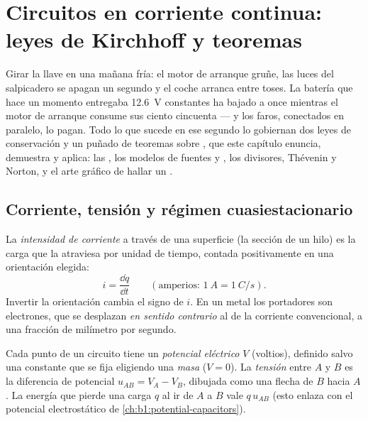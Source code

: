 \chapter{Circuitos en corriente continua: leyes de Kirchhoff y teoremas}\label{ch:b1:dc-circuits}

Girar la llave en una mañana fría: el motor de arranque gruñe, las luces
del salpicadero se apagan un segundo y el coche arranca entre toses. La
batería que hace un momento entregaba \qty{12.6}{V} constantes ha bajado a
once mientras el motor de arranque consume sus ciento cincuenta 
--- y los faros, conectados en paralelo, lo pagan. Todo lo que sucede en
ese segundo lo gobiernan dos leyes de conservación y un puñado de teoremas
sobre , que este capítulo enuncia, demuestra y aplica:
las , los modelos de fuentes y , los
divisores, Thévenin y Norton, y el arte gráfico de hallar un .

\section{Corriente, tensión y régimen cuasiestacionario}

\begin{definition}\label{def:b1:dc-circuits:current}
La \emph{intensidad de corriente} a través de una superficie (la sección
de un hilo) es la carga que la atraviesa por unidad de tiempo, contada
positivamente en una orientación elegida:
\[
i = \frac{\dd q}{\dd t} \qquad (\text{amperios: } \qty{1}{A} = \qty{1}{C/s}).
\]
Invertir la orientación cambia el signo de $i$. En un metal los portadores
son electrones, que se desplazan \emph{en sentido contrario} al de la
corriente convencional, a una fracción de milímetro por segundo.
\end{definition}

\begin{definition}\label{def:b1:dc-circuits:voltage}
Cada punto de un circuito tiene un \emph{potencial eléctrico} $V$
(voltios), definido salvo una constante que se fija eligiendo una
\emph{masa} ($V = 0$). La \emph{tensión} entre $A$ y $B$ es la diferencia
de potencial $u_{AB} = V_A - V_B$, dibujada como una flecha de $B$ hacia
$A$. La energía que pierde una carga $q$ al ir de $A$ a $B$ vale
$q\,u_{AB}$ (esto enlaza con el potencial electrostático de
\cref{ch:b1:potential-capacitors}).
\end{definition}

